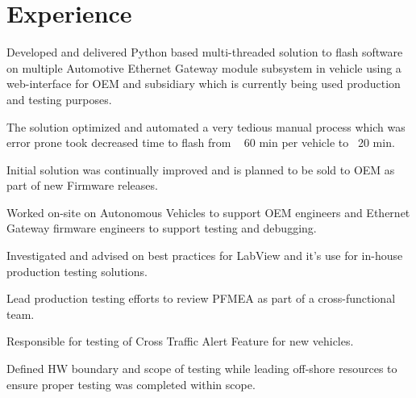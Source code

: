\documentclass[]{deedy-resume-openfont}
\begin{document}
\begin{minipage}[t]{0.66\textwidth} 


\section{Experience}

\vspace{\topsep} %
\begin{tightemize}
\item Developed and delivered Python based multi-threaded solution to flash software on multiple Automotive Ethernet Gateway module subsystem in vehicle using a web-interface for OEM and subsidiary which is currently being used production and testing purposes. 
	\begin{tightemize}
	\vspace{\topsep} %
	\item The solution optimized and automated a very tedious manual process which was error prone took decreased time to flash from ~ 60 min per vehicle to ~20 min.
	\item Initial solution was continually improved and is planned to be sold to OEM as part of new Firmware releases.
	\vspace{\topsep} %
	\end{tightemize}
\item Worked on-site on Autonomous Vehicles to support OEM engineers and Ethernet Gateway firmware engineers to support testing and debugging. 
\item Investigated and advised on best practices for LabView and it's use for in-house production testing solutions.
\item Lead production testing efforts to review PFMEA as part of a cross-functional team.
\end{tightemize}
\sectionsep

\vspace{\topsep} %
\begin{tightemize}
\item Responsible for testing of Cross Traffic Alert Feature for new vehicles.
\item Defined HW boundary and scope of testing while leading off-shore resources to ensure proper testing was completed within scope.
\end{tightemize}
\sectionsep


\end{minipage}
\end{document}
